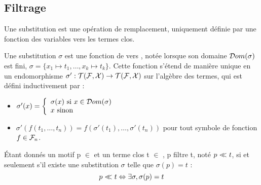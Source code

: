 

\subsection{Filtrage}
\label{subsec:filtrage}

Une substitution est une opération de remplacement, uniquement définie par une
fonction des variables vers les termes clos.

\begin{definition}[Substitution]
Une substitution $\sigma$ est une fonction de \caX vers \TF, notée lorsque son
domaine $\mathcal{D}om(\sigma)$ est fini, $\sigma = \{x_1 \mapsto t_1, \ldots, x_k
\mapsto t_k\}$. Cette fonction s'étend de manière unique en un endomorphisme
$\sigma' : \mathcal{T}(\mathcal{F},\mathcal{X}) \rightarrow \mathcal{T}(\mathcal{F},\mathcal{X})$ sur l'algèbre des termes, qui est défini
inductivement par : 
\begin{itemize}
\item $\sigma'(x) = \left\{
			\begin{array}{l}
				\sigma(x) \text{ si } x \in \mathcal{D}om(\sigma)\\
				x \text{ sinon}\\
			\end{array} \right.$
\item $\sigma'(f(t_1,\ldots,t_n)) = f(\sigma'(t_1),\ldots,\sigma'(t_n))$ pour
tout symbole de fonction $f \in \mathcal{F}_n$.
\end{itemize}
\end{definition}

\begin{definition}[Filtrage]
Étant donnés un motif p $\in$ \TFX et un terme clos t $\in$ \TF, p filtre t,
noté $p \mathrel{\mbox{$~<\hspace{-1.1em}<~$}} t$, si et seulement s'il existe une substitution $\sigma$ telle que
$\sigma(p) = t$ :
	$$ p \mathrel{\mbox{$~<\hspace{-1.1em}<~$}} t \Leftrightarrow \exists \sigma, \sigma(p) = t $$
\end{definition}

